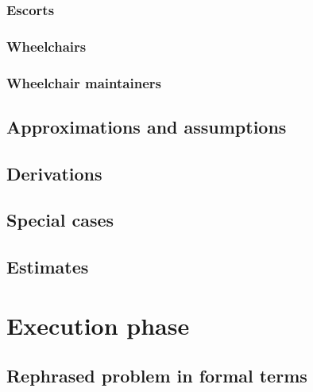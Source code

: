 \documentclass[a4paper, 12pt, notitlepage]{report}
\begin{document}
\subsection{Escorts}
\subsection{Wheelchairs}
\subsection{Wheelchair maintainers}

\section{Approximations and assumptions}
\section{Derivations}
\section{Special cases}
\section{Estimates}

\chapter{Execution phase}
\section{Rephrased problem in formal terms}


\end{document}
